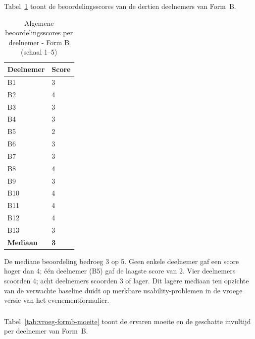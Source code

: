 Tabel~\ref{tab:vroeg-formb-ratings} toont de beoordelingsscores van de dertien deelnemers van Form~B.

\begin{table}[h]
  \centering
  \caption[Algemene beoordelingsscores vroege test Form B]{Algemene beoordelingsscores per deelnemer - Form B (schaal 1–5)}
  \label{tab:vroeg-formb-ratings}
  \begin{tabular}{ll}
    \hline
    \textbf{Deelnemer} & \textbf{Score} \\
    \hline
    B1  & 3 \\
    B2  & 4 \\
    B3  & 3 \\
    B4  & 3 \\
    B5  & 2 \\
    B6  & 3 \\
    B7  & 3 \\
    B8  & 4 \\
    B9  & 3 \\
    B10 & 4 \\
    B11 & 4 \\
    B12 & 4 \\
    B13 & 3 \\
    \hline
    \textbf{Mediaan} & \textbf{3} \\
    \hline
  \end{tabular}
\end{table}

De mediane beoordeling bedroeg 3 op 5. Geen enkele deelnemer gaf een score hoger dan 4; één deelnemer (B5) gaf de laagste score van 2. Vier deelnemers scoorden 4; acht deelnemers scoorden 3 of lager. Dit lagere mediaan ten opzichte van de verwachte baseline duidt op merkbare usability-problemen in de vroege versie van het evenementformulier.

\subsubsection{}

Tabel~\ref{tab:vroeg-formb-moeite} toont de ervaren moeite en de geschatte invultijd per deelnemer van Form~B.


